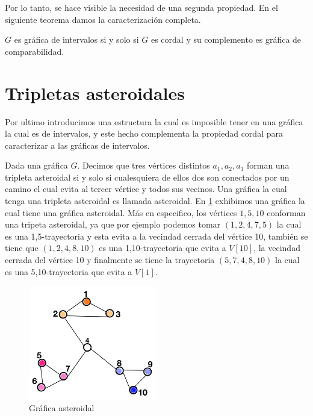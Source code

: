 Por lo tanto, se hace visible la necesidad de una segunda propiedad. En el siguiente teorema damos la caracterización completa.

\begin{teorema}
\label{teo:Crctzn1}
    $G$ es gráfica de intervalos si y solo si $G$ es cordal y su complemento es gráfica de comparabilidad.
\end{teorema}

\section{Tripletas asteroidales}
\label{sec:AstTrpls}
Por ultimo introducimos una estructura la cual es imposible tener en una gráfica la cual es de intervalos, y este hecho complementa la propiedad cordal para caracterizar a las gráficas de intervalos.

Dada una gráfica $G$. Decimos que tres vértices distintos $a_1,a_2,a_3$ forman una tripleta asteroidal si y solo si cualesquiera de ellos dos son conectados por un camino el cual evita al tercer vértice y todos sus vecinos. Una gráfica la cual tenga una tripleta asteroidal es llamada asteroidal. En \cref{fig:GrafAstrdl} exhibimos una gráfica la cual tiene una gráfica asteroidal. Más en especifico, los vértices $1,5,10$ conforman una tripeta asteroidal, ya que por ejemplo podemos tomar $(1,2,4,7,5)$ la cual es una 1,5-trayectoria y esta evita a la vecindad cerrada del vértice 10, también se tiene que $(1,2,4,8,10)$ es una 1,10-trayectoria que evita a $V[10]$, la vecindad cerrada del vértice 10 y finalmente se tiene la trayectoria $(5,7,4,8,10)$ la cual es una 5,10-trayectoria que evita a $V[1]$.

\begin{figure}[H]
  \centering
  \includegraphics[width=0.5\textwidth]{recursos/capturas/Ast-Trpl.jpg}
  \caption{Gráfica asteroidal}
  \label{fig:GrafAstrdl}
\end{figure}

